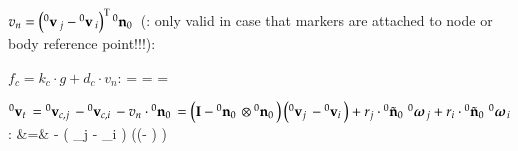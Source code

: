   \item $v_n = \left( \prescript{0}{}{\mathbf{v}}\,_j - \prescript{0}{}{\mathbf{v}}\,_i \right)^\mathrm{T} \prescript{0}{}{\mathbf{n}_0}\,$ (: only valid in case that markers are attached to node or body reference point!!!):
  \be
  \ee
  \be
  \ee
  \item $f_c = k_c \cdot g + d_c \cdot v_n$:
  \be
     = 
     = 
  \ee
  \be
     = 
  \ee
\item $\prescript{0}{}{\mathbf{v}_t}\, = \prescript{0}{}{\mathbf{v}_{c,j}}\, - \prescript{0}{}{\mathbf{v}_{c,i}}\, - v_n \cdot \prescript{0}{}{\mathbf{n}_0}\,=
\left( \mathbf{I} - \prescript{0}{}{\mathbf{n}_0}\, \otimes \prescript{0}{}{\mathbf{n}_0}\,\right) \left( \prescript{0}{}{\mathbf{v}_j}\, -\prescript{0}{}{\mathbf{v}_i}\, \right) 
        + r_j \cdot \prescript{0}{}{\tilde {\mathbf{n}}_0}\, \prescript{0}{}{\mbox{\boldmath $\omega$ \unboldmath}\!\!}\,_{j} 
        + r_i \cdot \prescript{0}{}{\tilde {\mathbf{n}}_0}\, \prescript{0}{}{\mbox{\boldmath $\omega$ \unboldmath}\!\!}\,_{i}$:
  \bea
     &=& 
    - \otimes \left( _j - _i \right) \left(\left(\Im - \otimes {} \right)         \right) \nonumber\\
